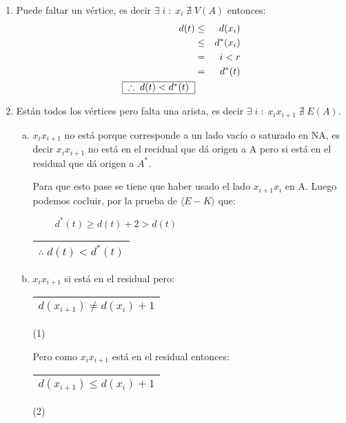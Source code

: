 \documentclass[12pt,a4paper]{report}
\newcounter{neq}
\begin{document}
		\begin{enumerate}
			\item Puede faltar un vértice, es decir $\exists \; i \; : \; x_{i} \; \nexists \; V(A)$ entonces:
			\begin{eqnarray}
				\nonumber d(t) & \leq & d(x_{i}) \\
				\nonumber & \leq & d^{*}(x_{i}) \\
				\nonumber & = & i < r \\
				\nonumber & = & d^{*}(t) \\
				\nonumber \begin{tabular}{|c|} \hline $\therefore \; d(t) < d^{*}(t)$ \\ \hline \end{tabular}
			\end{eqnarray}

			\item Están todos los vértices pero falta una arista, es decir $\exists \; i \; : \; x_{i}x_{i+1} \; \nexists \; E(A)$.
			\begin{enumerate}[a)]
				\item $x_{i}x_{i+1}$ no está porque corresponde a un lado vacío o saturado en NA, es decir $x_{i}x_{i+1}$ no está en el recidual que dá origen a A pero si está en el residual que dá origen a $A^{*}$.

				Para que esto pase se tiene que haber usado el lado $x_{i+1}x_{i}$ en A. Luego podemos cocluir, por la prueba de $\langle E-K \rangle$ que:
				\begin{center}
					$\qquad \; d^{*}(t) \geq d(t) + 2 > d(t) $

					\vspace{2mm}
					\begin{tabular}{|c|} \hline $\therefore \; d(t) < d^{*}(t)$ \\ \hline \end{tabular}
				\end{center}

				\item $x_{i}x_{i+1}$ si está en el residual pero:
				\begin{tabular}{|c|} \hline $d(x_{i+1}) \neq d(x_{i}) +1 $ \\ \hline \end{tabular} (1)

				\vspace{5mm}
				Pero como $x_{i}x_{i+1}$ está en el residual entonces:
				\begin{tabular}{|c|} \hline $d(x_{i+1}) \leq d(x_{i}) +1 $ \\ \hline \end{tabular} (2)


\end{enumerate}
\end{enumerate}
\end{document}
